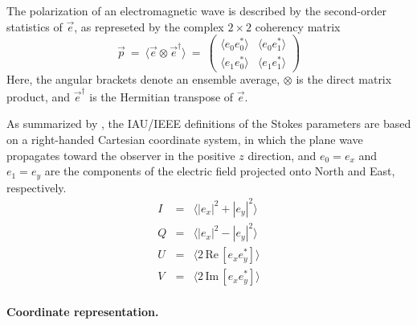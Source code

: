 \documentclass[a4paper,10pt,bibtotoc]{scrreprt}
\begin{document}
The polarization of an electromagnetic wave is described by the
second-order statistics of $\vec{e}$, as represeted by the complex $2
\times 2$ coherency matrix
\begin{equation}
  \label{eq:coherency-matrix}
  \vec{p} \ = \ \langle \vec{e} \otimes \vec{e}^{\dagger} \rangle
  \ = \ \left(
    \begin{array}{cc}
      \langle e_{0} e_{0}^{\ast} \rangle & \langle e_{0} e_{1}^{\ast} \rangle \\
      \langle e_{1} e_{0}^{\ast} \rangle & \langle e_{1} e_{1}^{\ast} \rangle
    \end{array}
  \right)  
\end{equation}
Here, the angular brackets denote an ensemble average, $\otimes$ is
the direct matrix product, and $\vec{e}^{\dagger}$ is the Hermitian
transpose of $\vec{e}$.

As summarized by \cite{polarimetry.paper3}, the IAU/IEEE definitions of
the Stokes parameters are based on a right-handed Cartesian coordinate
system, in which the plane wave propagates toward the observer in the
positive $z$ direction, and $e_{0} = e_{x}$ and $e_{1} = e_{y}$ are
the components of the electric field projected onto North and East,
respectively.
\begin{eqnarray}
  \label{eq:4}
  I & = & \langle |e_{x}|^{2} + |e_{y}|^{2} \rangle  \\
  Q & = & \langle |e_{x}|^{2} - |e_{y}|^{2} \rangle  \\
  U & = & \langle 2\, \mathrm{Re}\, [ e_{x} e_{y}^{\ast}] \rangle  \\
  V & = & \langle 2\, \mathrm{Im}\, [ e_{x} e_{y}^{\ast}] \rangle 
\end{eqnarray}

\paragraph{Coordinate representation.}


\end{document}
